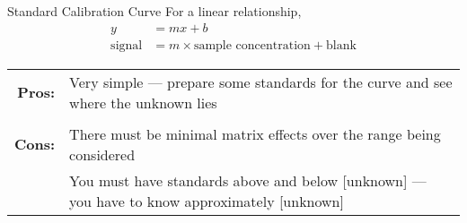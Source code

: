 \documentclass[notes=hide]{beamer}
\begin{document}
\begin{frame}{Standard Calibration Curve}
	For a \alert{linear} relationship,
	\begin{align*}
		y &= mx + b \\
		\text{signal} &= m \times \text{sample concentration} +
		\text{blank}
	\end{align*}

	\begin{tabularx}{\linewidth} {>{\bfseries}r X}
		Pros: &
		Very simple --- prepare some standards for the curve
		and see where the unknown lies \\ \\
		Cons: &
		There must be minimal \alert{matrix effects} over the
		range being considered \\
		      & You must have standards above and below
		      [unknown] --- you
			have to know approximately [unknown] \\
	\end{tabularx}
\end{frame}

\clearpage
\end{document}
